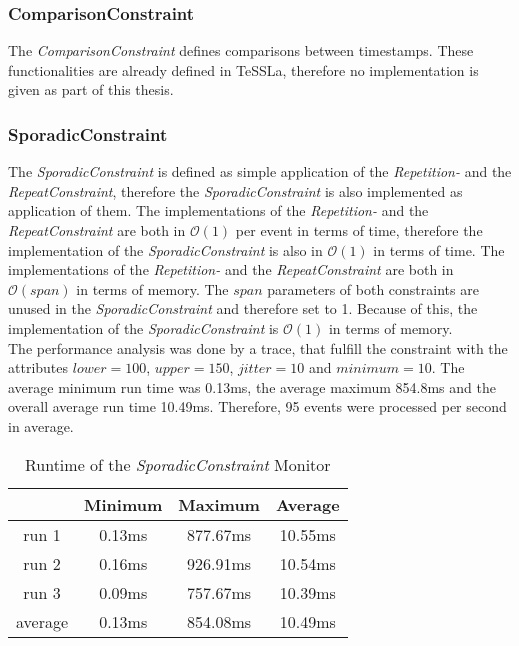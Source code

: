 \subsubsection{ComparisonConstraint}
	The \emph{ComparisonConstraint} defines comparisons between timestamps. These functionalities are already defined in TeSSLa, therefore no implementation is given as part of this thesis.  
	
\subsubsection{SporadicConstraint}
	The \emph{SporadicConstraint} is defined as simple application of the \emph{Repetition-} and the \emph{RepeatConstraint}, therefore the \emph{SporadicConstraint} is also implemented as application of them. The implementations of the \emph{Repetition-} and the \emph{RepeatConstraint} are both in $\mathcal{O}(1)$ per event in terms of time, therefore the implementation of the \emph{SporadicConstraint} is also in  $\mathcal{O}(1)$ in terms of time. The implementations of the \emph{Repetition-} and the \emph{RepeatConstraint} are both in $\mathcal{O}(span)$ in terms of memory. The $span$ parameters of both constraints are unused in the \emph{SporadicConstraint} and therefore set to 1. Because of this, the implementation of the \emph{SporadicConstraint} is $\mathcal{O}(1)$ in terms of memory.\\
	The performance analysis was done by a trace, that fulfill the constraint with the attributes $lower=100$, $upper = 150$, $jitter=10$ and $minimum=10$. The average minimum run time  was 0.13ms, the average maximum 854.8ms and the overall average run time 10.49ms. Therefore, 95 events were processed per second in average.
	\begin{table}
		\begin{tabular}{|c|c|c|c|}
			\hline
					& Minimum & Maximum & Average \\
			\hline
			run 1	& 0.13ms & 877.67ms & 10.55ms \\
			\hline
			run 2	& 0.16ms & 926.91ms & 10.54ms\\
			\hline
			run 3	& 0.09ms & 757.67ms & 10.39ms\\
			\hline
			average & 0.13ms & 854.08ms & 10.49ms\\
			\hline
		\end{tabular}
		\centering
		\label{tab:runtimeSporadicConstraint}
		\caption{Runtime of the \emph{SporadicConstraint} Monitor}
	\end{table}
	
